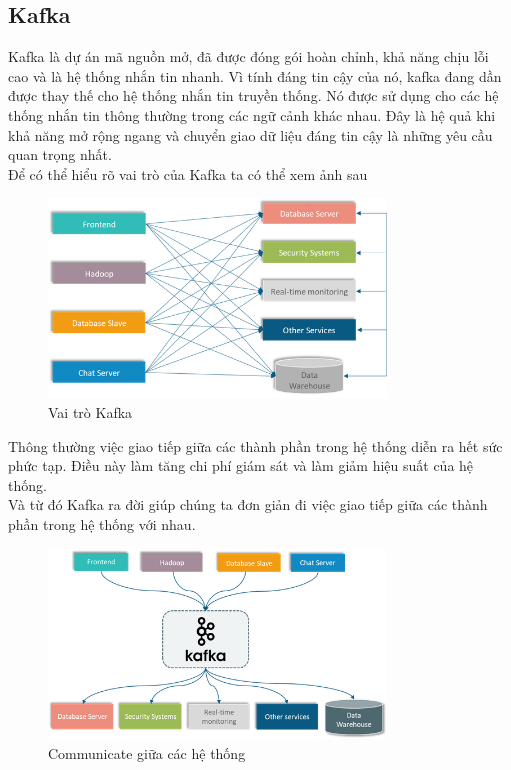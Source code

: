             \subsection{Kafka}
            
            Kafka là dự án mã nguồn mở, đã được đóng gói hoàn chỉnh, khả năng chịu lỗi cao và là hệ thống nhắn tin nhanh. Vì tính đáng tin cậy của nó, kafka đang dần được thay thế cho hệ thống nhắn tin truyền thống. Nó được sử dụng cho các hệ thống nhắn tin thông thường trong các ngữ cảnh khác nhau. Đây là hệ quả khi khả năng mở rộng ngang và chuyển giao dữ liệu đáng tin cậy là những yêu cầu quan trọng nhất.\\
            
            Để có thể hiểu rõ vai trò của Kafka ta có thể xem ảnh sau
            
            \begin{figure}[H]   			
            	\includegraphics[width=0.8\textwidth]{Images/Kafka1.png}
    			\centering
    			\linebreak
    			\caption{Vai trò Kafka}
            \end{figure}
            
            Thông thường việc giao tiếp giữa các thành phần trong hệ thống diễn ra hết sức phức tạp. Điều này làm tăng chi phí giám sát và làm giảm hiệu suất của hệ thống.\\
            
            Và từ đó Kafka ra đời giúp chúng ta đơn giản đi việc giao tiếp giữa các thành phần trong hệ thống với nhau.
            
             \begin{figure}[H]   			\includegraphics[width=0.8\textwidth]{Images/Kafka3.png}
    		\centering
    		\linebreak
    		\caption{Communicate giữa các hệ thống}
            \end{figure}
            
